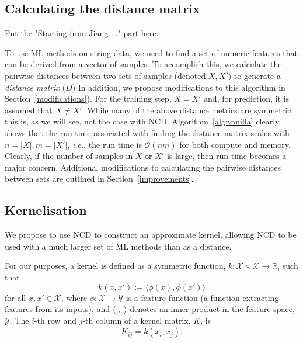 \documentclass[preprint,12pt]{article}
\begin{document}
% 


\subsection{Calculating the distance matrix}
\label{distance_matrix}

Put the "Starting from Jiang ..." part here.

To use ML methods on string data, we need to find a set of numeric features that can be derived from a vector of samples.
To accomplish this, we calculate the pairwise distances between two sets of samples (denoted $X, X'$) to generate a \textit{distance matrix} ($D$) 
In addition, we propose modifications to this algorithm in Section~\ref{modifications}).
For the training step, $X = X'$ and, for prediction, it is assumed that $X \neq X'$.
While many of the above distance metrics are symmetric, this is, as we will see, not the case with NCD.
Algorithm~\ref{alg:vanilla} clearly shows that the run time associated with finding the distance matrix scales with $n = | X |, m = | X' |$, \textit{i.e.}, the run time is $\mathcal{O}(nm)$ for both compute and memory.
Clearly, if the number of samples in $X$ or $X'$ is large, then run-time becomes a major concern.
Additional modifications to calculating the pairwise distances between sets are outlined in Section~\ref{improvements}.






\subsection{Kernelisation}
\label{kernels}

We propose to use NCD to construct an approximate kernel, allowing NCD to be used with a much larger set of ML methods than as a distance.

For our purposes, a kernel is defined as a symmetric function, $k : \mathcal{X} \times \mathcal{X} \rightarrow \mathbb{R}$, such that
\begin{equation}
    k(x, x') := \langle \phi(x), \phi(x') \rangle 
    \label{eq:kernel}
\end{equation}
for all $x, x' \in \mathcal{X}$,
where $\phi: \mathcal{X} \to \mathcal{Y}$ is a feature function (a function extracting features from its inputs), and $\langle \cdot, \cdot \rangle$ denotes an inner product in the feature space, $\mathcal{Y}$.
The $i$-th row and $j$-th column of a kernel matrix, $K$, is
$$
    K_{ij} = k(x_i, x_j).
$$
\end{document}
